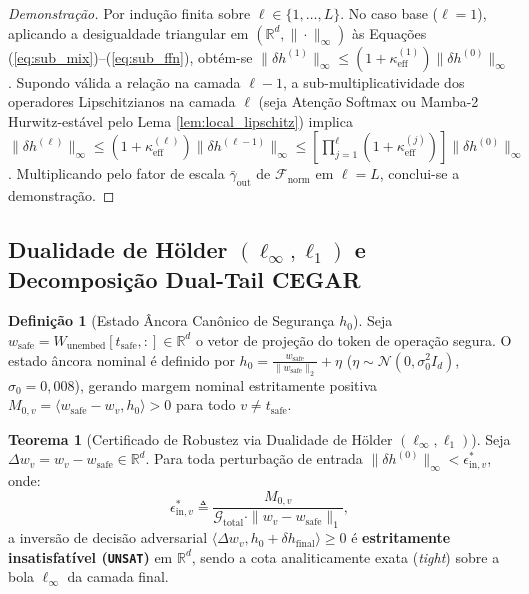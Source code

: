 \documentclass[11pt,a4paper]{article}
\theoremstyle{definition}
\newtheorem{definition}{Definição}
\newtheorem{theorem}{Teorema}
\begin{document}
\begin{proof}[Demonstração]
Por indução finita sobre $\ell \in \{1, \dots, L\}$. No caso base ($\ell=1$), aplicando a desigualdade triangular em $(\mathbb{R}^d, \|\cdot\|_\infty)$ às Equações (\ref{eq:sub_mix})--(\ref{eq:sub_ffn}), obtém-se $\|\delta h^{(1)}\|_\infty \le (1 + \kappa_{\text{eff}}^{(1)})\|\delta h^{(0)}\|_\infty$. Supondo válida a relação na camada $\ell-1$, a sub-multiplicatividade dos operadores Lipschitzianos na camada $\ell$ (seja Atenção Softmax ou Mamba-2 Hurwitz-estável pelo Lema \ref{lem:local_lipschitz}) implica $\|\delta h^{(\ell)}\|_\infty \le (1+\kappa_{\text{eff}}^{(\ell)})\|\delta h^{(\ell-1)}\|_\infty \le \left[\prod_{j=1}^\ell (1+\kappa_{\text{eff}}^{(j)})\right]\|\delta h^{(0)}\|_\infty$. Multiplicando pelo fator de escala $\bar{\gamma}_{\text{out}}$ de $\mathcal{F}_{\text{norm}}$ em $\ell=L$, conclui-se a demonstração.
\end{proof}

\subsection{Dualidade de Hölder \texorpdfstring{$(\ell_\infty, \ell_1)$}{(l-inf, l-1)} e Decomposição Dual-Tail CEGAR}

\begin{definition}[Estado Âncora Canônico de Segurança $h_0$]
Seja $w_{\text{safe}} = W_{\text{unembed}}[t_{\text{safe}}, :] \in \mathbb{R}^d$ o vetor de projeção do token de operação segura. O estado âncora nominal é definido por $h_0 = \frac{w_{\text{safe}}}{\|w_{\text{safe}}\|_2} + \eta$ ($\eta \sim \mathcal{N}(0, \sigma_0^2 I_d)$, $\sigma_0 = 0{,}008$), gerando margem nominal estritamente positiva $M_{0,v} = \langle w_{\text{safe}} - w_v, h_0 \rangle > 0$ para todo $v \neq t_{\text{safe}}$.
\end{definition}

\begin{theorem}[Certificado de Robustez via Dualidade de Hölder $(\ell_\infty, \ell_1)$]
\label{thm:holder_duality}
Seja $\Delta w_v = w_v - w_{\text{safe}} \in \mathbb{R}^d$. Para toda perturbação de entrada $\|\delta h^{(0)}\|_\infty < \epsilon_{\text{in},v}^*$, onde:
\begin{equation}
    \epsilon_{\text{in},v}^* \triangleq \frac{M_{0,v}}{\mathcal{G}_{\text{total}} \cdot \|w_v - w_{\text{safe}}\|_1},
\end{equation}
a inversão de decisão adversarial $\langle \Delta w_v, h_0 + \delta h_{\text{final}} \rangle \ge 0$ é \textbf{estritamente insatisfatível (\texttt{UNSAT})} em $\mathbb{R}^d$, sendo a cota analiticamente exata (\textit{tight}) sobre a bola $\ell_\infty$ da camada final.
\end{theorem}
\end{document}
